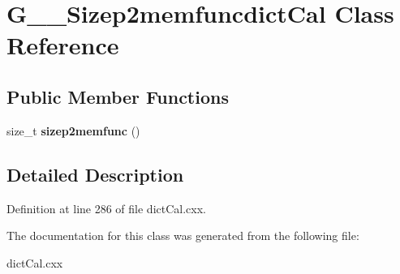 \hypertarget{classG____Sizep2memfuncdictCal}{
\section{G\_\-\_\-Sizep2memfuncdictCal Class Reference}
\label{classG____Sizep2memfuncdictCal}
}
\subsection*{Public Member Functions}
\begin{DoxyCompactItemize}
\item 
\hypertarget{classG____Sizep2memfuncdictCal_ac4a205e693865719da997ae55822b53d}{
size\_\-t {\bfseries sizep2memfunc} ()}
\label{classG____Sizep2memfuncdictCal_ac4a205e693865719da997ae55822b53d}

\end{DoxyCompactItemize}


\subsection{Detailed Description}


Definition at line 286 of file dictCal.cxx.



The documentation for this class was generated from the following file:\begin{DoxyCompactItemize}
\item 
dictCal.cxx\end{DoxyCompactItemize}
